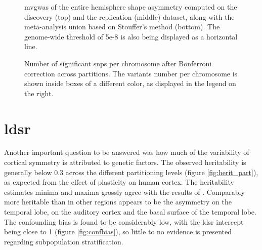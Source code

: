 \begin{figure}[H]
	\centering
	\subfloat{
		
	}
	\par\medskip
	\centering
	\subfloat{
			
	}
	\par\medskip
	\centering
	\subfloat{
			
	}
	\caption[mvGWAS of the entire hemisphere shape asymmetry]{\Ac{mvgwas} of the entire hemisphere shape asymmetry computed on the discovery (top) and the replication (middle) dataset, along with the meta-analysis union based on Stouffer's method (bottom). The genome-wide threshold of 5e-8 is also being displayed as a horizontal line.}
	\label{fig:entire_gwas}
\end{figure}


\begin{figure}[H]
	\begin{adjustwidth}{-4cm}{-3cm}
	\centering
	\subfloat{
		
	}
	\subfloat{
		
	}
	\end{adjustwidth}	
	\caption[Number of significant SNPs after Bonferroni correction along partitions]{Number of significant \acp{snp} per chromosome after Bonferroni correction across partitions. The variants number per chromosome is shown inside boxes of a different color, as displayed in the legend on the right.}
	\label{fig:part_bonferroni}
\end{figure}

\section{\acs{ldsr}}
\label{sec:ldsr_results}
Another important question to be answered was how much of the variability of cortical symmetry is attributed to genetic factors. The observed heritability is generally below 0.3 across the different partitioning levels (figure \autoref{fig:herit_part}), as expected from the effect of plasticity on human cortex. The heritability estimates minima and maxima grossly agree with the results of \citet{Sha2021}. Comparably more heritable than in other regions appears to be the asymmetry on the temporal lobe, on the auditory cortex and the basal surface of the temporal lobe.  The confounding bias is found to be considerably low, with the \ac{ldsr} intercept being close to 1 \cite{Bulik-Sullivan2015} (figure \autoref{fig:confbias}), so little to no evidence is presented regarding subpopulation stratification. 


